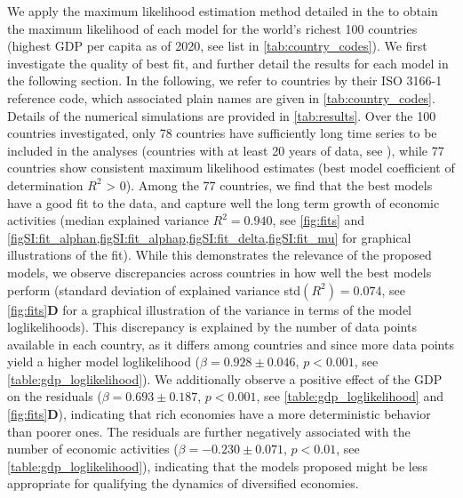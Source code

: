 We apply the maximum likelihood estimation method detailed in the  to obtain the maximum likelihood of each model for the world's richest 100 countries (highest GDP per capita as of 2020, see list in \cref{tab:country_codes}). 
% 
We first investigate the quality of best fit, and further detail the results for each model in the following section. %
% 
In the following, we refer to countries by their ISO 3166-1 reference code, which associated plain names are given in \cref{tab:country_codes}.
% 
Details of the numerical simulations are provided in \cref{tab:results}.
%
Over the 100 countries investigated, only 78 countries have sufficiently long time series to be included in the analyses (countries with at least 20 years of data, see ), while 77 countries show consistent maximum likelihood estimates (best model coefficient of determination $R^2$ > 0).
% 
Among the 77 countries, we find that the best models have a good fit to the data, and capture well the long term growth of economic activities (median explained variance $R^2 = 0.940$, see \cref{fig:fits} and \cref{figSI:fit_alphan,figSI:fit_alphap,figSI:fit_delta,figSI:fit_mu} for graphical illustrations of the fit).
% 
While this demonstrates the relevance of the proposed models, we observe discrepancies across countries in how well the best models perform (standard deviation of explained variance std$(R^2)= 0.074$, see \cref{fig:fits}\textbf{D} for a graphical illustration of the variance in terms of the model loglikelihoods).
% 
% 
This discrepancy is explained by the number of data points available in each country, as it differs among countries and since more data points yield a higher model loglikelihood ($\beta = 0.928 \pm 0.046$, $p<0.001$, see \cref{table:gdp_loglikelihood}).
% 
We additionally observe a positive effect of the GDP on the residuals ($\beta = 0.693 \pm 0.187$, $p<0.001$, see \cref{table:gdp_loglikelihood} and \cref{fig:fits}\textbf{D}), indicating that rich economies have a more deterministic behavior than poorer ones. The residuals are further negatively associated with the number of economic activities ($\beta = -0.230 \pm 0.071$, $p<0.01$, see \cref{table:gdp_loglikelihood}), indicating that the models proposed might be less appropriate for qualifying the dynamics of diversified economies.
% 
% 

